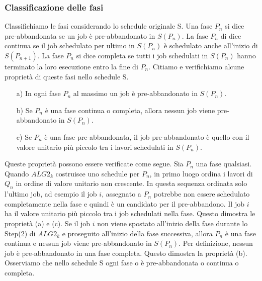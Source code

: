 \documentclass[12pt]{article}
\begin{document}
\subsubsection{Classificazione delle fasi}
Classifichiamo le fasi considerando lo schedule originale S. Una fase $P_{n}$ si dice pre-abbandonata se un job è pre-abbandonato in $S(P_{n})$. La fase $P_{n}$ di dice continua se il job schedulato per ultimo in $S(P_{n})$ è schedulato anche all'inizio di $S(P_{n + 1})$. La fase $P_{n}$ si dice completa se tutti i job schedulati in $S(P_{n})$ hanno terminato la loro esecuzione entro la fine di $P_{n}$. 
\newline Citiamo e verifichiamo alcune proprietà di queste fasi nello schedule S. 
\begin{enumerate}
\item [a)] In ogni fase $P_{n}$ al massimo un job è pre-abbandonato in $S(P_{n})$.
\item [b)] Se $P_{n}$ è una fase continua o completa, allora nessun job viene pre-abbandonato in $S(P_{n})$. 
\item [c)] Se $P_{n}$ è una fase pre-abbandonata, il job pre-abbandonato è quello con il valore unitario più piccolo tra i lavori schedulati in $S(P_{n})$. 
\end{enumerate}
Queste proprietà possono essere verificate come segue. Sia $P_{n}$ una fase qualsiasi. Quando $ALG2_{k}$ costruisce uno schedule per $P_{n}$, in primo luogo ordina i lavori di $Q_{n}$ in ordine di valore unitario non crescente. In questa sequenza ordinata solo l'ultimo job, ad esempio il job $i$, assegnato a $P_{n}$ potrebbe non essere schedulato completamente nella fase e quindi è un candidato per il pre-abbandono. Il job $i$ ha il valore unitario più piccolo tra i job schedulati nella fase. Questo dimostra le proprietà (a) e (c). Se il job $i$ non viene spostato all'inizio della fase durante lo Step(2) di $ALG2_{k}$ e proseguito all'inizio della fase successiva, allora $P_{n}$ è una fase continua e nessun job viene pre-abbandonato in $S(P_{n})$. Per definizione, nessun job è pre-abbandonato in una fase completa. Questo dimostra la proprietà (b). Osserviamo che nello schedule S ogni fase o è pre-abbandonata o continua o completa.
\end{document}
